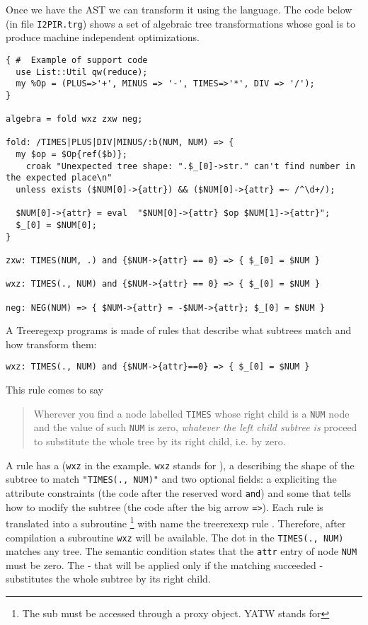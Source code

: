 Once we have the AST we can transform it
using the  language.
The code below (in file \verb|I2PIR.trg|)
shows a set of algebraic tree transformations
whose goal is to produce 
machine independent optimizations.
\begin{verbatim}
{ #  Example of support code
  use List::Util qw(reduce);
  my %Op = (PLUS=>'+', MINUS => '-', TIMES=>'*', DIV => '/');
}

algebra = fold wxz zxw neg;

fold: /TIMES|PLUS|DIV|MINUS/:b(NUM, NUM) => { 
  my $op = $Op{ref($b)};
    croak "Unexpected tree shape: ".$_[0]->str." can't find number in the expected place\n" 
  unless exists ($NUM[0]->{attr}) && ($NUM[0]->{attr} =~ /^\d+/);

  $NUM[0]->{attr} = eval  "$NUM[0]->{attr} $op $NUM[1]->{attr}";
  $_[0] = $NUM[0]; 
}

zxw: TIMES(NUM, .) and {$NUM->{attr} == 0} => { $_[0] = $NUM }

wxz: TIMES(., NUM) and {$NUM->{attr} == 0} => { $_[0] = $NUM }

neg: NEG(NUM) => { $NUM->{attr} = -$NUM->{attr}; $_[0] = $NUM }
\end{verbatim}
A Treeregexp programs is made of  rules
that describe what subtrees match and how transform them:
\begin{verbatim}
wxz: TIMES(., NUM) and {$NUM->{attr}==0} => { $_[0] = $NUM }
\end{verbatim}
This rule comes to say 
\begin{quote}
Wherever you find a node labelled \verb|TIMES| whose right
child is a \verb|NUM| node and the value of such \verb|NUM| is
zero, 
\emph{whatever the left child subtree is} proceed to
substitute the whole tree by its right child, i.e. by zero.

\end{quote}

A rule has a  (\verb|wxz| in the example. \verb|wxz|
stands for ), 
a  describing
the shape of the subtree to match \verb|"TIMES(., NUM)"|
and two optional fields:
a  expliciting
the attribute constraints (the code after the reserved word
\verb|and|)
and some  that tells how to 
modify the subtree (the code after the big arrow \verb|=>|).
Each rule is translated into a subroutine 
\footnote{The sub must be accessed 
through a proxy 
 object. YATW stands for }
with name the treerexexp rule .
Therefore, after compilation 
a subroutine \verb|wxz| will be available.
The dot in the  \verb|TIMES(., NUM)| 
matches any tree. The semantic condition
states that the \verb|attr| entry of node
\verb|NUM| must be zero.
The  - that will be 
applied only if the matching succeeded -
substitutes the whole subtree by its 
right child.

